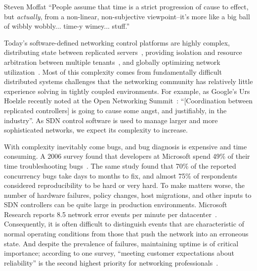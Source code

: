 \begin{aquote}{Steven Moffat}
``People assume that time is a strict progression of cause to effect,
but {\em actually}, from a non-linear, non-subjective viewpoint--it's more like a
big ball of wibbly wobbly... time-y wimey... stuff.''
\end{aquote}

Today's software-defined networking control platforms are highly complex,
distributing state between replicated
servers~\cite{floodlight},
providing isolation and resource arbitration between multiple
tenants~\cite{Casado:2010:VNF:1921151.1921162}, and
globally optimizing network utilization~\cite{urs}.
Most of this complexity comes from
fundamentally difficult distributed systems challenges that the networking community has
relatively little experience
solving in tightly coupled environments. %
For example, as Google's Urs H$\ddot{\mathrm{o}}$elzle recently
noted at the Open Networking Summit~\cite{urs}: ``[Coordination between replicated controllers] is going to
cause some angst, and justifiably, in the industry''. As SDN control software
is used to manage larger and more sophisticated networks,
we expect its complexity to increase.

With complexity inevitably come
bugs, and bug diagnosis is expensive and time consuming. A 2006 survey found
that developers at Microsoft spend 49\% of their
time troubleshooting bugs~\cite{msoft_concurrency}. The same study found that 70\% of the reported concurrency bugs
take days to months to fix, and almost 75\% of
respondents considered reproducibility to be hard or very hard.
To make matters worse, the number of hardware failures,
policy changes, host migrations, and other inputs to SDN controllers can
be quite large in production environments. Microsoft Research
reports 8.5 network error events per minute per
datacenter~\cite{Greenberg:2009:VSF:1592568.1592576}.
Consequently, it is often difficult to distinguish events that are
characteristic of normal operating
conditions from those that push the network into an erroneous state.
And despite the prevalence of failures, maintaining uptime is of critical importance; according to one
survey, ``meeting customer expectations about reliability'' is the second highest
priority for networking professionals~\cite{market_report}.


